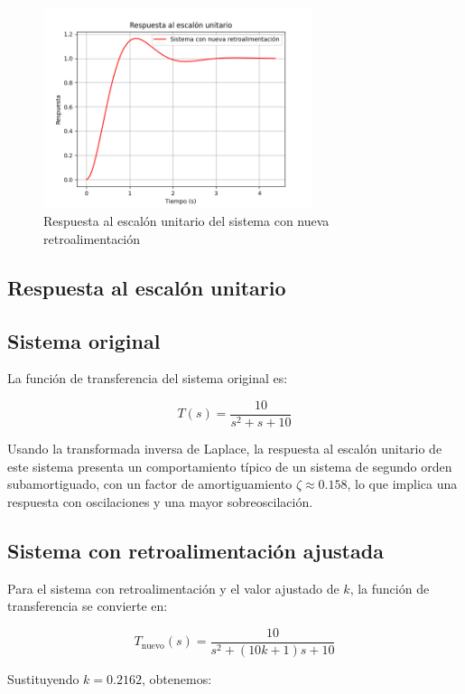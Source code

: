 \documentclass[10pt]{article}
\theoremstyle{definition}
\theoremstyle{remark}
\theoremstyle{definition}
\numberwithin{equation}{prob}
\begin{document}
\begin{figure}[h]
	\centering
	\includegraphics[width=0.7\textwidth]{./figures/Figura 5 ejercicio 5.png}
	\caption{Respuesta al escalón unitario del sistema con nueva retroalimentación}
\end{figure}

\newpage

\subsection{Respuesta al escalón unitario}

\subsection*{Sistema original}

La función de transferencia del sistema original es:

\[
	T(s) = \frac{10}{s^2 + s + 10}
\]

Usando la transformada inversa de Laplace, la respuesta al escalón unitario de este sistema presenta un comportamiento típico de un sistema de segundo orden subamortiguado, con un factor de amortiguamiento \(\zeta \approx 0.158\), lo que implica una respuesta con oscilaciones y una mayor sobreoscilación.

\subsection*{Sistema con retroalimentación ajustada}

Para el sistema con retroalimentación y el valor ajustado de \( k \), la función de transferencia se convierte en:

\[
	T_{\text{nuevo}}(s) = \frac{10}{s^2 + (10k + 1)s + 10}
\]

Sustituyendo \( k = 0.2162 \), obtenemos:
\end{document}
